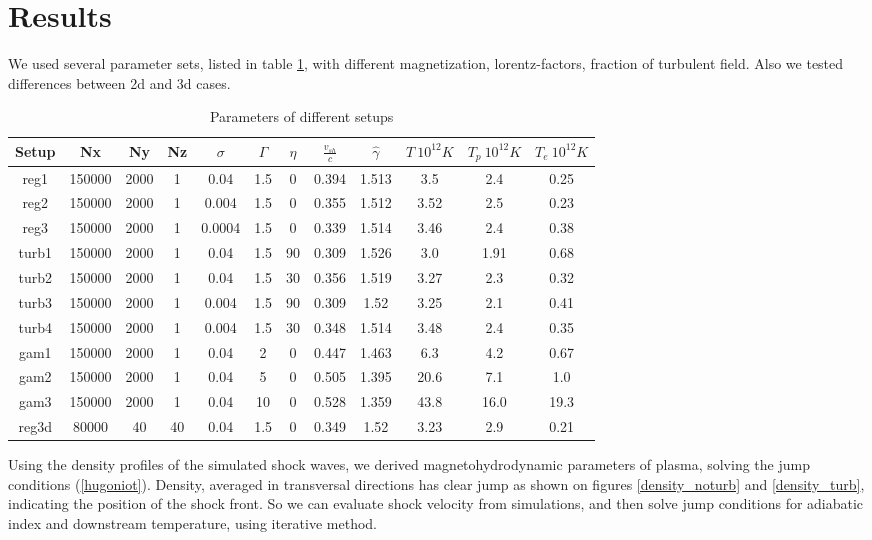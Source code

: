 \documentclass[a4paper]{jpconf}
\begin{document}
	\section{Results}
	We used several parameter sets, listed in table \ref{setups}, with different magnetization, lorentz-factors, fraction of turbulent field. Also we tested differences between 2d and 3d cases. 
	\begin{table}[h!]
		\label{setups}
		\begin{center}
			\begin{tabular}{|c | c| c| c| c| c| c| c| c| c| c| c|}
				\hline
				Setup & Nx & Ny & Nz & $\sigma$ & $\Gamma$ & $\eta$ & $\frac{v_{sh}}{c}$ & $\hat{\gamma}$ & $T \ 10^{12} K$ & $T_p\ 10^{12}K$ & $T_e \ 10^{12}K$\\
				\hline
				reg1 & 150000 & 2000 & 1 & 0.04 & 1.5 & 0 & 0.394 & 1.513 & 3.5 & 2.4 & 0.25\\
				reg2 & 150000 & 2000 & 1 & 0.004 & 1.5 & 0 & 0.355 & 1.512 & 3.52 & 2.5 & 0.23\\
				reg3 & 150000 & 2000 & 1 & 0.0004 & 1.5 & 0 & 0.339 & 1.514 & 3.46 &2.4 & 0.38\\
				turb1 & 150000 & 2000 & 1 & 0.04 & 1.5 & 90 & 0.309 & 1.526 & 3.0 & 1.91 & 0.68\\
				turb2 & 150000 & 2000 & 1 & 0.04 & 1.5 & 30 & 0.356 & 1.519 & 3.27 & 2.3 & 0.32\\
				turb3 & 150000 & 2000 & 1 & 0.004 & 1.5 & 90 & 0.309 & 1.52 & 3.25 & 2.1 & 0.41\\
				turb4 & 150000 & 2000 & 1 & 0.004 & 1.5 & 30 & 0.348 & 1.514 & 3.48 & 2.4 & 0.35\\
				gam1 & 150000 & 2000 & 1 & 0.04 & 2 & 0 & 0.447 & 1.463 & 6.3 & 4.2 & 0.67\\
				gam2 & 150000 & 2000 & 1 & 0.04 & 5 & 0 & 0.505 & 1.395 & 20.6 & 7.1 & 1.0\\
				gam3 & 150000 & 2000 & 1 & 0.04 & 10 & 0 & 0.528 & 1.359 & 43.8 & 16.0 & 19.3\\
				reg3d & 80000 & 40 & 40 & 0.04 & 1.5 & 0 & 0.349 & 1.52 & 3.23 & 2.9 & 0.21\\
				
				\hline
			\end{tabular}
		\end{center}
		\caption{Parameters of different setups}
	\end{table}
	
	Using the density profiles of the simulated shock waves, we derived magnetohydrodynamic parameters of plasma, solving the jump conditions (\ref{hugoniot}). Density, averaged in transversal directions  has clear jump as shown on figures \ref{density_noturb} and \ref{density_turb}, indicating the position of the shock front. So we can evaluate shock velocity from simulations, and then solve jump conditions for adiabatic index and downstream temperature, using iterative method.
	
\end{document}

